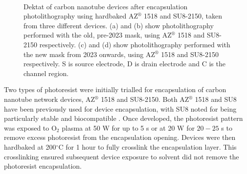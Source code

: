 \documentclass[
  a4paper,
]{scrbook}
\begin{document}
\begin{figure}
\begin{minipage}[t]{0.45\linewidth}
{{}

}

\end{minipage}%
%
\begin{minipage}[t]{0.01\linewidth}

{\centering 

~

}

\end{minipage}%

\caption[Dektat profiles of carbon nanotube devices after encapsulation
photolithography using hardbaked AZ 1518 and SU8-2150, taken from three
different devices.]{\label{fig-dektat-encapsulation}Dektat of carbon
nanotube devices after encapsulation photolithography using hardbaked
AZ\(^\circledR\) 1518 and SU8-2150, taken from three different devices.
(a) and (b) show photolithography performed with the old, pre-2023 mask,
using AZ\(^\circledR\) 1518 and SU8-2150 respectively. (c) and (d) show
photolithography performed with the new mask from 2023 onwards, using
AZ\(^\circledR\) 1518 and SU8-2150 respectively. S is source electrode,
D is drain electrode and C is the channel region.}

\end{figure}

Two types of photoresist were initially trialled for encapsulation of
carbon nanotube network devices, AZ\(^\circledR\) 1518 and SU8-2150.
Both AZ\(^\circledR\) 1518
\autocite{Murugathas2018,Murugathas2019a,Shkodra2021} and SU8 have been
previously used for device encapsulation, with SU8 noted for being
particularly stable and biocompatible
\autocite{Lee2006,Chen2021,Albarghouthi2022}. Once developed, the
photoresist pattern was exposed to O\(_2\) plasma at 50 W for up to 5 s
or at 20 W for \(20-25\) s to remove excess photoresist from the
encapsulation opening. Devices were then hardbaked at 200\(^\circ\)C for
1 hour to fully crosslink the encapsulation layer. This crosslinking
ensured subsequent device exposure to solvent did not remove the
photoresist encapsulation.
\end{document}
